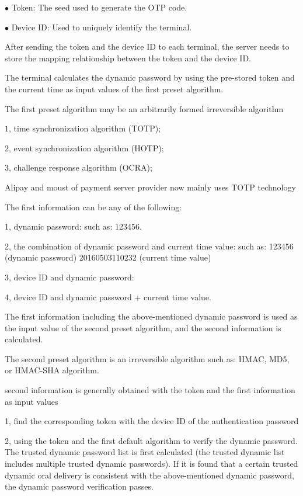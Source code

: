 \documentclass[journal]{IEEEtran}
\begin{document}
$\bullet$ Token: The seed used to generate the OTP code.

$\bullet$ Device ID: Used to uniquely identify the terminal.

After sending the token and the device ID to each terminal, the server needs to store the mapping relationship between the token and the device ID.


The terminal calculates the dynamic password by using the pre-stored token and the current time as input values of the first preset algorithm.

The first preset algorithm may be an arbitrarily formed irreversible algorithm
                           
                           $1$, time synchronization algorithm (TOTP);
 
                           $2$, event synchronization algorithm (HOTP);

                           $3$, challenge response algorithm (OCRA);

Alipay and moust of payment server provider now mainly uses TOTP technology




The first information can be any of the following:

1, dynamic password: such as: 123456.

2, the combination of dynamic password and current time value: such as: 123456 (dynamic password) 20160503110232 (current time value)

3, device ID and dynamic password:

4, device ID and dynamic password + current time value.

The first information including the above-mentioned dynamic password is used as the input value of the second preset algorithm, and the second information is calculated.

The second preset algorithm is an irreversible algorithm such as: HMAC, MD5, or HMAC-SHA algorithm.

 second information is generally obtained with the token and the first information as input values

1, find the corresponding token with the device ID of the authentication password

2, using the token and the first default algorithm to verify the dynamic password.
The trusted dynamic password list is first calculated (the trusted dynamic list includes multiple trusted dynamic passwords).
If it is found that a certain trusted dynamic oral delivery is consistent with the above-mentioned dynamic password, the dynamic password verification passes.
\end{document}
